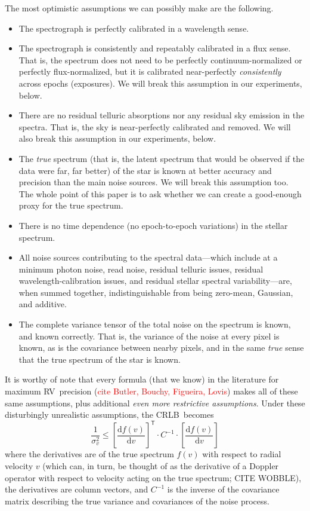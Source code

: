 \documentclass[modern]{aastex62}
\newcommand{\dd}{\mathrm{d}}
\newcommand{\T}{^{\mathsf{T}}}
\newcommand{\todo}[1]{\textcolor{red}{#1}}  %
\newcommand{\acronym}[1]{{\small{#1}}}
\newcommand{\RV}{\acronym{RV}}
\newcommand{\CRLB}{\acronym{CRLB}}
\begin{document}
The most optimistic assumptions we can possibly make are the following.
\begin{itemize}
\item The spectrograph is perfectly calibrated in a wavelength sense.
\item The spectrograph is consistently and repeatably calibrated in a
  flux sense. That is, the spectrum does not need to be perfectly
  continuum-normalized or perfectly flux-normalized, but it is
  calibrated near-perfectly \emph{consistently} across epochs (exposures).
  We will break this assumption in our experiments, below.
\item There are no residual telluric absorptions nor any residual sky
  emission in the spectra. That is, the sky is near-perfectly calibrated
  and removed.
  We will also break this assumption in our experiments, below.
\item The \emph{true} spectrum (that is, the latent spectrum that
  would be observed if the data were far, far better) of the star is
  known at better accuracy and precision than the main noise sources.
  We will break this assumption too.
  The whole point of this paper is to ask whether we can create a
  good-enough proxy for the true spectrum.
\item There is no time dependence (no epoch-to-epoch variations) in the
  stellar spectrum.
\item All noise sources contributing to the spectral data---which
  include at a minimum photon noise, read noise, residual telluric
  issues, residual wavelength-calibration issues, and residual stellar
  spectral variability---are, when summed together, indistinguishable
  from being zero-mean, Gaussian, and additive.
\item The complete variance tensor of the total noise on the spectrum is known, and
  known correctly. That is, the variance of the noise at every pixel
  is known, as is the covariance between nearby pixels, and in the
  same \emph{true} sense that the true spectrum of the star is known.
\end{itemize}
It is worthy of note that every formula (that we know) in the
literature for maximum \RV\ precision (\todo{cite Butler, Bouchy,
  Figueira, Lovis}) makes all of these same assumptions,
plus additional \emph{even more restrictive assumptions}.
Under these disturbingly unrealistic assumptions, the \CRLB\ becomes
\begin{equation}\label{eq:crlb}
\frac{1}{\sigma_v^2} \leq \left[\frac{\dd f(v)}{\dd v}\right]\T\cdot C^{-1}\cdot\left[\frac{\dd f(v)}{\dd v}\right]
\end{equation}
where the derivatives are of the true spectrum $f(v)$ with respect to
radial velocity $v$ (which can, in turn, be thought of as the derivative of a Doppler
operator with respect to velocity acting on the true spectrum; CITE WOBBLE), the
derivatives are column vectors, and $C^{-1}$ is the inverse of the covariance matrix
describing the true variance and covariances of the noise process.
\end{document}
